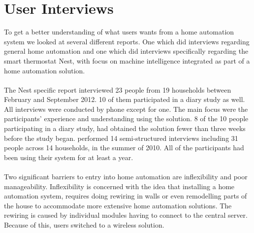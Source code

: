 \section{User Interviews}
\label{sec:interviewReports}
To get a better understanding of what users wants from a home automation system we looked at several different reports. One which did interviews regarding general home automation\cite{HAInterviews} and one which did interviews specifically regarding the smart thermostat Nest, with focus on machine intelligence integrated as part of a home automation solution\cite{AdaptiveInterviews}. 
\\\\
The Nest specific report interviewed 23 people from 19 households between February and September 2012. 10 of them participated in a diary study as well. All interviews were conducted by phone except for one. The main focus were the participants' experience and understanding using the solution. 8 of the 10 people participating in a diary study, had obtained the solution fewer than three weeks before the study began\cite{AdaptiveInterviews}. 
\cite{HAInterviews} performed 14 semi-structured interviews including 31 people across 14 households, in the summer of 2010. All of the participants had been using their system for at least a year.
\\\\
Two significant barriers to entry into home automation are inflexibility and poor manageability\cite{HAInterviews}. Inflexibility is concerned with the idea that installing a home automation system, requires doing rewiring in walls or even remodelling parts of the house to accommodate more extensive home automation solutions. The rewiring is caused by individual modules having to connect to the central server. Because of this, users switched to a wireless solution\cite{HAInterviews}.

